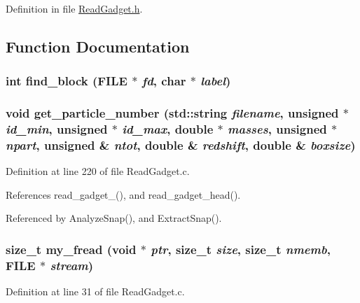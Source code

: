 Definition in file \hyperlink{ReadGadget_8h_source}{ReadGadget.h}.



\subsection{Function Documentation}
\subsubsection[{find\_\-block}]{\setlength{\rightskip}{0pt plus 5cm}int find\_\-block (FILE $\ast$ {\em fd}, \/  char $\ast$ {\em label})}\label{ReadGadget_8h_ac8dbc7568a52801fefe47be7fb92c69c}
\subsubsection[{get\_\-particle\_\-number}]{\setlength{\rightskip}{0pt plus 5cm}void get\_\-particle\_\-number (std::string {\em filename}, \/  unsigned $\ast$ {\em id\_\-min}, \/  unsigned $\ast$ {\em id\_\-max}, \/  double $\ast$ {\em masses}, \/  unsigned $\ast$ {\em npart}, \/  unsigned \& {\em ntot}, \/  double \& {\em redshift}, \/  double \& {\em boxsize})}\label{ReadGadget_8h_a275b45dee34efc2ef2f3bb402ca17993}


Definition at line 220 of file ReadGadget.c.



References read\_\-gadget\_(), and read\_\-gadget\_\-head().



Referenced by AnalyzeSnap(), and ExtractSnap().

\subsubsection[{my\_\-fread}]{\setlength{\rightskip}{0pt plus 5cm}size\_\-t my\_\-fread (void $\ast$ {\em ptr}, \/  size\_\-t {\em size}, \/  size\_\-t {\em nmemb}, \/  FILE $\ast$ {\em stream})}\label{ReadGadget_8h_a1609620c03f6b0068601735c42e3c660}


Definition at line 31 of file ReadGadget.c.



